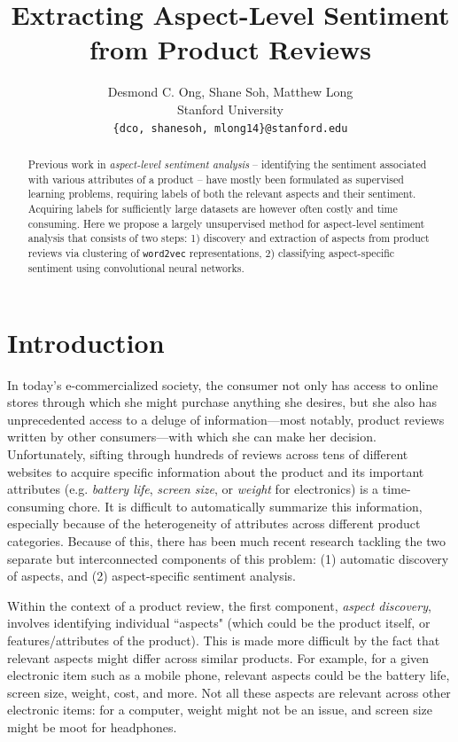 \documentclass{article} %
\title{  Extracting Aspect-Level Sentiment from Product Reviews  }
\author{
Desmond C. Ong, Shane Soh, Matthew Long \\
Stanford University \\
\texttt{\{dco, shanesoh, mlong14\}@stanford.edu}
}
\begin{document}
\maketitle

\begin{abstract}
Previous work in \textit{aspect-level sentiment analysis} -- identifying the sentiment associated with various attributes of a product -- have mostly been formulated as supervised learning problems, requiring labels of both the relevant aspects and their sentiment. Acquiring labels for sufficiently large datasets are however often costly and time consuming. Here we propose a largely unsupervised method for aspect-level sentiment analysis that consists of two steps: 1) discovery and extraction of aspects from product reviews via clustering of \texttt{word2vec} representations, 2) classifying aspect-specific sentiment using convolutional neural networks.
\end{abstract}

\section{Introduction}

In today's e-commercialized society, the consumer not only has access to online stores through which she might purchase anything she desires, but she also has unprecedented access to a deluge of information---most notably, product reviews written by other consumers---with which she can make her decision. Unfortunately, sifting through hundreds of reviews across tens of different websites to acquire specific information about the product and its important attributes (e.g. \textit{battery life}, \textit{screen size}, or \textit{weight} for electronics) is a time-consuming chore. It is difficult to automatically summarize this information, especially because of the heterogeneity of attributes across different product categories. Because of this, there has been much recent research tackling the two separate but interconnected components of this problem: (1) automatic discovery of aspects, and (2) aspect-specific sentiment analysis.

Within the context of a product review, the first component, \textit{aspect discovery}, involves identifying individual ``aspects" (which could be the product itself, or features/attributes of the product). This is made more difficult by the fact that relevant aspects might differ across similar products. For example, for a given electronic item such as a mobile phone, relevant aspects could be the battery life, screen size, weight, cost, and more. Not all these aspects are relevant across other electronic items: for a computer, weight might not be an issue, and screen size might be moot for headphones. 
\end{document}
